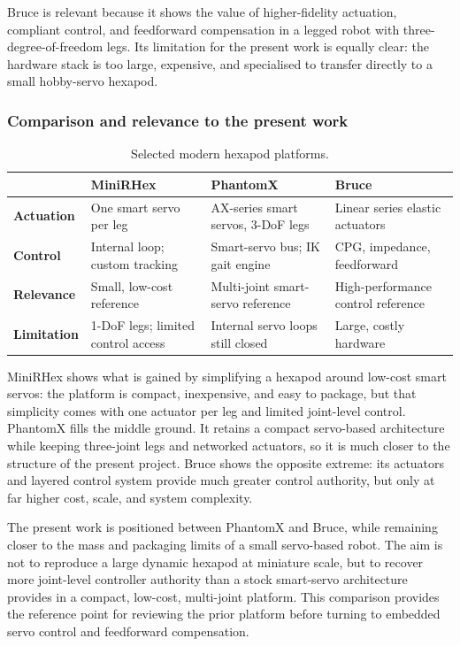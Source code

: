 Bruce is relevant because it shows the value of higher-fidelity actuation, compliant control, and feedforward compensation in a legged robot with three-degree-of-freedom legs. Its limitation for the present work is equally clear: the hardware stack is too large, expensive, and specialised to transfer directly to a small hobby-servo hexapod.

\subsubsection{Comparison and relevance to the present work}

\begin{table}[H]
  \centering
  \caption{Selected modern hexapod platforms.}
  \label{tab:modern_hexapod_platforms}
  \begin{tabularx}{\linewidth}{lYYY}
    \toprule
    & \textbf{MiniRHex} & \textbf{PhantomX} & \textbf{Bruce} \\
    \midrule
    \textbf{Actuation} & One smart servo per leg & AX-series smart servos, 3-DoF legs & Linear series elastic actuators \\
    \textbf{Control} & Internal loop; custom tracking & Smart-servo bus; IK gait engine & CPG, impedance, feedforward \\
    \textbf{Relevance} & Small, low-cost reference & Multi-joint smart-servo reference & High-performance control reference \\
    \textbf{Limitation} & 1-DoF legs; limited control access & Internal servo loops still closed & Large, costly hardware \\
    \bottomrule
  \end{tabularx}
\end{table}

MiniRHex shows what is gained by simplifying a hexapod around low-cost smart servos: the platform is compact, inexpensive, and easy to package, but that simplicity comes with one actuator per leg and limited joint-level control. PhantomX fills the middle ground. It retains a compact servo-based architecture while keeping three-joint legs and networked actuators, so it is much closer to the structure of the present project. Bruce shows the opposite extreme: its actuators and layered control system provide much greater control authority, but only at far higher cost, scale, and system complexity.

The present work is positioned between PhantomX and Bruce, while remaining closer to the mass and packaging limits of a small servo-based robot. The aim is not to reproduce a large dynamic hexapod at miniature scale, but to recover more joint-level controller authority than a stock smart-servo architecture provides in a compact, low-cost, multi-joint platform. This comparison provides the reference point for reviewing the prior platform before turning to embedded servo control and feedforward compensation.

